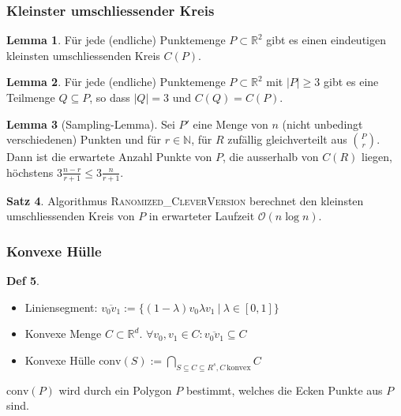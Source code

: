 \documentclass[a4paper, 10pt]{article}
\theoremstyle{definition}
\newtheorem{definition}{Def}[section]
\newtheorem{theorem}[definition]{Satz}
\newtheorem{nlemma}[definition]{Lemma}
\theoremstyle{named}
\newcommand{\R}{\mathbb{R}}
\newcommand{\N}{\mathbb{N}}
\newcommand{\BO}{\mathcal{O}}
\newcommand{\conv}{\text{conv}}
\begin{document}
\subsubsection{Kleinster umschliessender Kreis}

\begin{nlemma}
    Für jede (endliche) Punktemenge $P \subset \R^2$ gibt es einen eindeutigen kleinsten umschliessenden Kreis $C(P)$.
\end{nlemma}

\begin{nlemma}
    Für jede (endliche) Punktemenge $P \subset \R^2$ mit $|P| \geq 3$ gibt es eine Teilmenge $Q \subseteq P$, so dass $|Q| = 3$ und $C(Q) = C(P)$.
\end{nlemma}

\setcounter{definition}{27}
\begin{nlemma}[Sampling-Lemma]
    Sei $P'$ eine Menge von $n$ (nicht unbedingt verschiedenen) Punkten und für $r \in \N$, für $R$ zufällig gleichverteilt aus $\binom{P}{r}$. Dann ist die erwartete Anzahl Punkte von $P$, die ausserhalb von $C(R)$ liegen, höchstens $3 \frac{n - r}{r + 1} \leq 3 \frac{n}{r + 1}$.
\end{nlemma}

\begin{theorem}
    Algorithmus \textsc{Ranomized\_CleverVersion} berechnet den kleinsten umschliessenden Kreis von $P$ in erwarteter Laufzeit $\BO(n \log n)$.
\end{theorem}

\subsubsection{Konvexe Hülle}
\setcounter{definition}{32}
\begin{definition} $\,$
    \begin{itemize}
        \item Liniensegment: $\overline{v_0v_1} := \{ (1 - \lambda) v_0  \lambda v_1 \ | \ \lambda \in [0, 1] \}$
        \item Konvexe Menge $C \subset \R^d$. $\forall v_0, v_1 \in C: \overline{v_0v_1} \subseteq C$
        \item Konvexe Hülle $\conv(S) := \bigcap\limits_{S \subseteq C \subseteq R^s, C \ \text{konvex}} C$
    \end{itemize}
    $\conv(P)$ wird durch ein Polygon $P$ bestimmt, welches die Ecken Punkte aus $P$ sind.
\end{definition}
\end{document}
